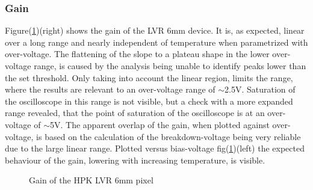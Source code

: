 \documentclass[12pt,article,type=msc,colorback,accentcolor=tud9c]{tudthesis}
\begin{document}
\subsubsection{Gain}
\label{subsubsec:LVR6Gain}
Figure(\ref{fig:LVR6_Gain})(right) shows the gain of the LVR 6mm device. It is, as expected, linear over a long range and nearly independent of temperature when parametrized with over-voltage. The flattening of the slope to a plateau shape in the lower over-voltage range, is caused by the analysis being unable to identify peaks lower than the set threshold. Only taking into account the linear region, limits the range, where the results are relevant to an over-voltage range of $\sim$2.5V. Saturation of the oscilloscope in this range is not visible, but a check with a more expanded range revealed, that the point of saturation of the oscilloscope is at an over-voltage of $\sim$5V. The apparent overlap of the gain, when plotted against over-voltage, is based on the calculation of the breakdown-voltage being very reliable due to the large linear range. Plotted versus bias-voltage fig(\ref{fig:LVR6_Gain})(left) the expected behaviour of the gain, lowering with increasing temperature, is visible. 
\begin{figure}[h]
\begin{centering}
\caption{Gain of the HPK LVR 6mm pixel}
\label{fig:LVR6_Gain}
\end{centering}
\end{figure}
\end{document}
